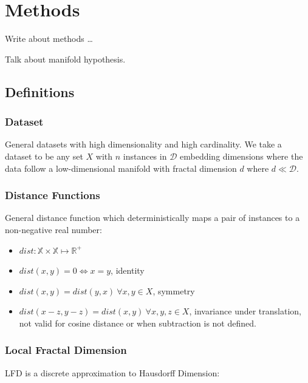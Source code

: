 \section{Methods}
\label{sec:methods}

Write about methods \dots

Talk about manifold hypothesis.

\subsection{Definitions}
\label{subsec:methods:definitions}

\subsubsection{Dataset}
\label{subsubsec:methods:definitions:dataset}

General datasets with high dimensionality and high cardinality.
We take a dataset to be any set $X$ with $n$ instances in $\mathcal{D}$ embedding dimensions where the data follow a low-dimensional manifold with fractal dimension $d$ where $d \ll \mathcal{D}$.

\subsubsection{Distance Functions}
\label{subsubsec:methods:definitions:distance-functions}

General distance function which deterministically maps a pair of instances to a non-negative real number:
\begin{itemize}
    \item $dist: \mathbb{X} \times \mathbb{X} \mapsto \mathbb{R}^+$
    \item $dist(x, y) = 0 \Leftrightarrow x = y$, identity
    \item $dist(x, y) = dist(y, x) \ \forall x, y \in X$, symmetry
    \item $dist(x - z, y - z) = dist(x, y) \ \forall x, y, z \in X$, invariance under translation, not valid for cosine distance or when subtraction is not defined.
\end{itemize}

\subsubsection{Local Fractal Dimension}
\label{subsubsec:methods:definitions:local-fractal-dimension}

LFD is a discrete approximation to Hausdorff Dimension:

